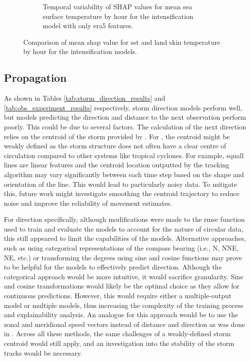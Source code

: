 \begin{figure}[ht]
\begin{subfigure}[t]{\textwidth}
        \caption{Temporal variability of SHAP values for mean sea surface temperature by hour for the intensification model with only \acrshort{era5} features.}
        \label{fig:obs_intensification_era5_shap_mean_sst_by_hour}
    \end{subfigure}
    \caption{Comparison of mean \acrshort{shap} value for \acrshort{sst} and land skin temperature by hour for the intensification models.}
    \label{fig:obs_intensification_sst_skt_by_hour}
\end{figure}

\subsection{Propagation}
\label{sec:results-propagation}

As shown in Tables \ref{tab:storm_direction_results} and \ref{tab:obs_experiment_results} respectively, storm direction models perform well, but models predicting the direction and distance to the next observation perform poorly. This could be due to several factors. The calculation of the next direction relies on the centroid of the storm provided by \cite{Hill2023}. For , the centroid might be weakly defined as the storm structure does not often have a clear centre of circulation compared to other systems like tropical cyclones. For example, squall lines are linear features and the centroid location outputted by the tracking algorithm may vary significantly between each time step based on the shape and orientation of the line. This would lead to particularly noisy data. To mitigate this, future work might investigate smoothing the centroid trajectory to reduce noise and improve the reliability of movement estimates.

For direction specifically, although modifications were made to the \acrshort{rmse} function used to train and evaluate the models to account for the nature of circular data, this still appeared to limit the capabilities of the models. Alternative approaches, such as using categorical representations of the compass bearing (i.e., N, NNE, NE, etc.) or transforming the degrees using sine and cosine functions may prove to be helpful for the models to effectively predict direction. Although the categorical approach would be more intuitive, it would sacrifice granularity. Sine and cosine transformations would likely be the optimal choice as they allow for continuous predictions. However, this would require either a multiple-output model or multiple models, thus increasing the complexity of the training process and explainability analysis. An analogue for this approach would be to use the zonal and meridional speed vectors instead of distance and direction as was done in \cite{Hunt2024}. Across all these methods, the same challenges of a weakly-defined storm centroid would still apply, and an investigation into the stability of the storm tracks would be necessary.

